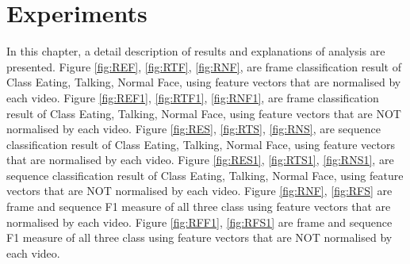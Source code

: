 \section{Experiments}
In this chapter, a detail description of results and explanations of analysis are presented. Figure \ref{fig:REF}, \ref{fig:RTF}, \ref{fig:RNF}, are frame classification result of Class Eating, Talking, Normal Face, using feature vectors that are normalised by each video. Figure \ref{fig:REF1}, \ref{fig:RTF1}, \ref{fig:RNF1}, are frame classification result of Class Eating, Talking, Normal Face, using feature vectors that are NOT normalised by each video. Figure \ref{fig:RES}, \ref{fig:RTS}, \ref{fig:RNS}, are sequence classification result of Class Eating, Talking, Normal Face, using feature vectors that are normalised by each video. Figure \ref{fig:RES1}, \ref{fig:RTS1}, \ref{fig:RNS1}, are sequence classification result of Class Eating, Talking, Normal Face, using feature vectors that are NOT normalised by each video. Figure \ref{fig:RNF}, \ref{fig:RFS} are frame and sequence F1 measure of all three class using feature vectors that are normalised by each video. Figure \ref{fig:RFF1}, \ref{fig:RFS1} are frame and sequence F1 measure of all three class using feature vectors that are NOT normalised by each video.

